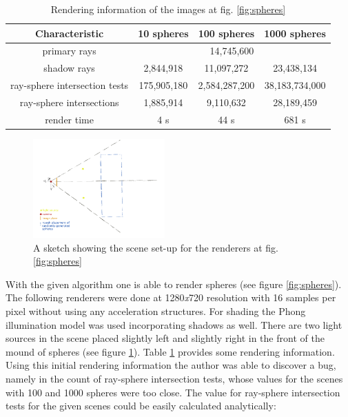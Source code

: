 \documentclass{article}
\begin{document}
\begin{table}[!ht]
\centering
	\begin{tabular}{*4c} 
		\hline
 		Characteristic & 10 spheres & 100 spheres & 1000 spheres \\ [0.5ex] 
 		\hline\hline
 		primary rays & \multicolumn{3}{c}{14,745,600} \\ 
 		shadow rays & 2,844,918 & 11,097,272 & 23,438,134 \\
 		ray-sphere intersection tests & 175,905,180 & 2,584,287,200 & 38,183,734,000 \\
 		ray-sphere intersections & 1,885,914 & 9,110,632 & 28,189,459 \\
 		render time & 4 s & 44 s & 681 s \\
 		\hline
	\end{tabular}
\caption{Rendering information of the images at fig. \ref{fig:spheres}}
\label{table:sphere_renders}
\end{table}

\newpage

\begin{figure} 
    \centering
    \includegraphics[width=0.45\textwidth]{sphere_scene_sketch}
    \caption{A sketch showing the scene set-up for the renderers at fig. \ref{fig:spheres}}
    \label{fig:sphere_scene_sketch}
\end{figure}

With the given algorithm one is able to render spheres (see figure \ref{fig:spheres}). The following renderers were done at 1280\textit{x}720 resolution with 16 samples per pixel without using any acceleration structures. For shading the Phong illumination model was used incorporating shadows as well. There are two light sources in the scene placed slightly left and slightly right in the front of the mound of spheres (see figure \ref{fig:sphere_scene_sketch}). Table \ref{table:sphere_renders} provides some rendering information. Using this initial rendering information the author was able to discover a bug, namely in the count of ray-sphere intersection tests, whose values for the scenes with 100 and 1000 spheres were too close. The value for ray-sphere intersection tests for the given scenes could be easily calculated analytically:
\end{document}
